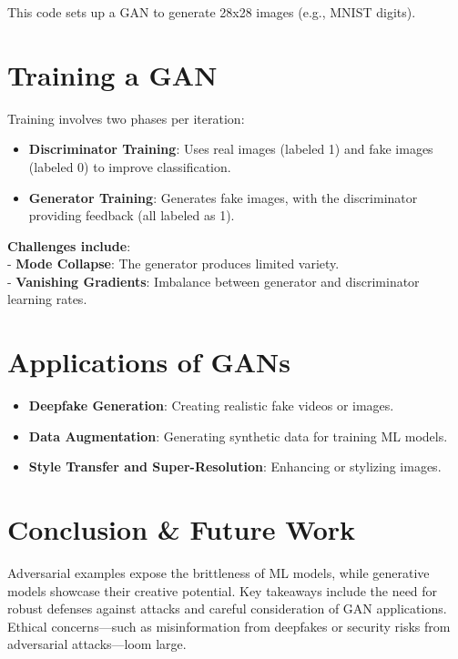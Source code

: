 \documentclass[
  letterpaper,
  DIV=11,
  numbers=noendperiod]{scrreprt}
\providecommand{\tightlist}{%
  \setlength{\itemsep}{0pt}\setlength{\parskip}{0pt}}\usepackage{longtable,booktabs,array}
\begin{document}
This code sets up a GAN to generate 28x28 images (e.g., MNIST digits).

\section{Training a GAN}\label{training-a-gan}

Training involves two phases per iteration:

\begin{itemize}
\tightlist
\item
  \textbf{Discriminator Training}: Uses real images (labeled 1) and fake
  images (labeled 0) to improve classification.\\
\item
  \textbf{Generator Training}: Generates fake images, with the
  discriminator providing feedback (all labeled as 1).
\end{itemize}

\textbf{Challenges include}:\\
- \textbf{Mode Collapse}: The generator produces limited variety.\\
- \textbf{Vanishing Gradients}: Imbalance between generator and
discriminator learning rates.

\section{Applications of GANs}\label{applications-of-gans}

\begin{itemize}
\tightlist
\item
  \textbf{Deepfake Generation}: Creating realistic fake videos or
  images.\\
\item
  \textbf{Data Augmentation}: Generating synthetic data for training ML
  models.\\
\item
  \textbf{Style Transfer and Super-Resolution}: Enhancing or stylizing
  images.
\end{itemize}

\section{Conclusion \& Future Work}\label{conclusion-future-work}

Adversarial examples expose the brittleness of ML models, while
generative models showcase their creative potential. Key takeaways
include the need for robust defenses against attacks and careful
consideration of GAN applications. Ethical concerns---such as
misinformation from deepfakes or security risks from adversarial
attacks---loom large.
\end{document}
